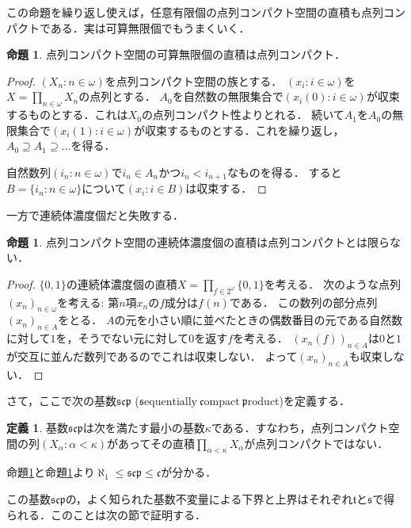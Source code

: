 \documentclass[uplatex,dvipdfmx]{jsarticle}
\newcommand{\frakt}{\mathfrak{t}}
\newcommand{\s}{\mathfrak{s}}
\newcommand{\scp}{\mathfrak{scp}}
\theoremstyle{definition}
\newtheorem*{defi*}{定義}
\newtheorem{prop}[thm]{命題}
\theoremstyle{named}
\begin{document}
この命題を繰り返し使えば，任意有限個の点列コンパクト空間の直積も点列コンパクトである．実は可算無限個でもうまくいく．

\begin{prop}\label{ctblisok}
点列コンパクト空間の可算無限個の直積は点列コンパクト．
\end{prop}
\begin{proof}
$(X_n : n \in \omega)$を点列コンパクト空間の族とする．
$(x_i : i \in \omega)$を$X = \prod_{n \in \omega} X_n$の点列とする．
$A_0$を自然数の無限集合で$(x_i(0) : i \in \omega)$が収束するものとする．これは$X_0$の点列コンパクト性よりとれる．
続いて$A_1$を$A_0$の無限集合で$(x_i(1) : i \in \omega)$が収束するものとする．これを繰り返し，$A_0 \supseteq A_1 \supseteq \dots$を得る．

自然数列$(i_n : n \in \omega)$で$i_n \in A_n$かつ$i_n <  i_{n+1}$なものを得る．
すると$B = \{ i_n : n \in \omega \}$について$(x_i : i \in B)$は収束する．
\end{proof}

一方で連続体濃度個だと失敗する．

\begin{prop}\label{continuumisng}
点列コンパクト空間の連続体濃度個の直積は点列コンパクトとは限らない．
\end{prop}
\begin{proof}
$\{0, 1\}$の連続体濃度個の直積$X = \prod_{f \in 2^\omega} \{0, 1\}$を考える．
次のような点列$(x_n)_{n \in \omega}$を考える: 第$n$項$x_n$の$f$成分は$f(n)$である．
この数列の部分点列$(x_n)_{n \in A}$をとる．
$A$の元を小さい順に並べたときの偶数番目の元である自然数に対して$1$を，そうでない元に対して$0$を返す$f$を考える．
$(x_n(f))_{n \in A}$は$0$と$1$が交互に並んだ数列であるのでこれは収束しない．
よって$(x_n)_{n \in A}$も収束しない．
\end{proof}

さて，ここで次の基数$\scp$ ($\mathrm{\mathfrak{s}equentially\ \mathfrak{c}ompact\ \mathfrak{p}roduct}$)を定義する．
\begin{defi*}
基数$\scp$は次を満たす最小の基数$\kappa$である．すなわち，点列コンパクト空間の列$(X_\alpha : \alpha < \kappa)$があってその直積$\prod_{\alpha < \kappa} X_\alpha$が点列コンパクトではない．
\end{defi*}

命題\ref{ctblisok}と命題\ref{continuumisng}より$\aleph_1 \le \scp \le \mathfrak{c}$が分かる．

この基数$\scp$の，よく知られた基数不変量による下界と上界はそれぞれ$\frakt$と$\s$で得られる．このことは次の節で証明する．
\end{document}
